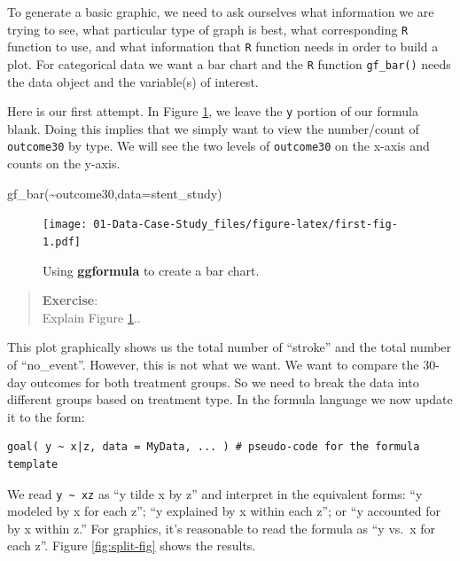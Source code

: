 \documentclass[
]{book}
\newenvironment{Shaded}{\begin{snugshade}}{\end{snugshade}}
\newcommand{\AttributeTok}[1]{\textcolor[rgb]{0.77,0.63,0.00}{#1}}
\newcommand{\FunctionTok}[1]{\textcolor[rgb]{0.00,0.00,0.00}{#1}}
\newcommand{\NormalTok}[1]{#1}
\newcommand{\SpecialCharTok}[1]{\textcolor[rgb]{0.00,0.00,0.00}{#1}}
\begin{document}
To generate a basic graphic, we need to ask ourselves what information we are trying to see, what particular type of graph is best, what corresponding \texttt{R} function to use, and what information that \texttt{R} function needs in order to build a plot. For categorical data we want a bar chart and the \texttt{R} function \texttt{gf\_bar()} needs the data object and the variable(s) of interest.

Here is our first attempt. In Figure \ref{fig:first-fig}, we leave the \texttt{y} portion of our formula blank. Doing this implies that we simply want to view the number/count of \texttt{outcome30} by type. We will see the two levels of \texttt{outcome30} on the x-axis and counts on the y-axis.



\begin{Shaded}
\begin{Highlighting}[]
\FunctionTok{gf\_bar}\NormalTok{(}\SpecialCharTok{\textasciitilde{}}\NormalTok{outcome30,}\AttributeTok{data=}\NormalTok{stent\_study)}
\end{Highlighting}
\end{Shaded}

\begin{figure}
\centering
\texttt{[image: 01-Data-Case-Study\_files/figure-latex/first-fig-1.pdf]}
\caption{\label{fig:first-fig}Using \textbf{ggformula} to create a bar chart.}
\end{figure}

\begin{quote}
\textbf{Exercise}:\\
Explain Figure \ref{fig:first-fig}..
\end{quote}

This plot graphically shows us the total number of ``stroke'' and the total number of ``no\_event''. However, this is not what we want. We want to compare the 30-day outcomes for both treatment groups. So we need to break the data into different groups based on treatment type. In the formula language we now update it to the form:

\begin{verbatim}
goal( y ~ x|z, data = MyData, ... ) # pseudo-code for the formula template
\end{verbatim}

We read \texttt{y\ \textasciitilde{}\ x\textbar{}z} as ``y tilde x by z'' and interpret in the equivalent forms: ``y modeled by x for each z''; ``y explained by x within each z''; or ``y accounted for by x within z.'' For graphics, it's reasonable to read the formula as ``y vs.~x for each z''. Figure \ref{fig:split-fig} shows the results.
\end{document}
